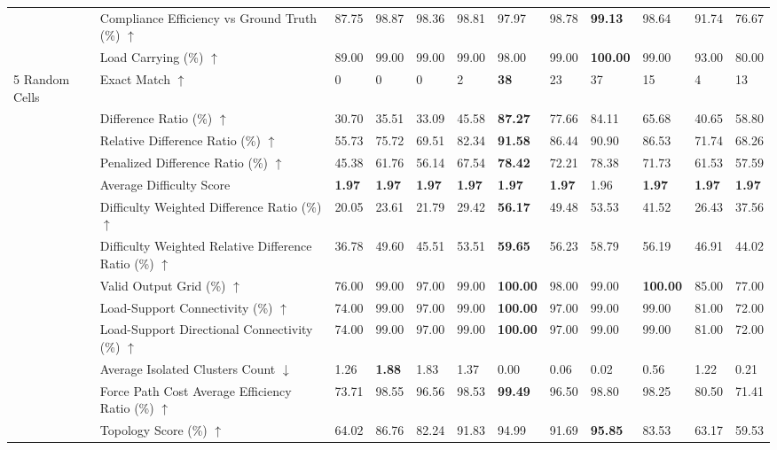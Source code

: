 \begin{table}[!h]
{\begin{tabular}{llllllllllll}
 & Compliance Efficiency vs Ground Truth (\%) $\uparrow$ & 87.75 & 98.87 & 98.36 & 98.81 & 97.97 & 98.78 & \textbf{99.13} & 98.64 & 91.74 & 76.67 \\
 & Load Carrying (\%) $\uparrow$ & 89.00 & 99.00 & 99.00 & 99.00 & 98.00 & 99.00 & \textbf{100.00} & 99.00 & 93.00 & 80.00 \\
5 Random Cells & Exact Match $\uparrow$ & 0 & 0 & 0 & 2 & \textbf{38} & 23 & 37 & 15 & 4 & 13 \\
 & Difference Ratio (\%) $\uparrow$ & 30.70 & 35.51 & 33.09 & 45.58 & \textbf{87.27} & 77.66 & 84.11 & 65.68 & 40.65 & 58.80 \\
 & Relative Difference Ratio (\%) $\uparrow$ & 55.73 & 75.72 & 69.51 & 82.34 & \textbf{91.58} & 86.44 & 90.90 & 86.53 & 71.74 & 68.26 \\
 & Penalized Difference Ratio (\%) $\uparrow$ & 45.38 & 61.76 & 56.14 & 67.54 & \textbf{78.42} & 72.21 & 78.38 & 71.73 & 61.53 & 57.59 \\
 & Average Difficulty Score & \textbf{1.97} & \textbf{1.97} & \textbf{1.97} & \textbf{1.97} & \textbf{1.97} & \textbf{1.97} & 1.96 & \textbf{1.97} & \textbf{1.97} & \textbf{1.97} \\
 & Difficulty Weighted Difference Ratio (\%) $\uparrow$ & 20.05 & 23.61 & 21.79 & 29.42 & \textbf{56.17} & 49.48 & 53.53 & 41.52 & 26.43 & 37.56 \\
 & Difficulty Weighted Relative Difference Ratio (\%) $\uparrow$ & 36.78 & 49.60 & 45.51 & 53.51 & \textbf{59.65} & 56.23 & 58.79 & 56.19 & 46.91 & 44.02 \\
 & Valid Output Grid (\%) $\uparrow$ & 76.00 & 99.00 & 97.00 & 99.00 & \textbf{100.00} & 98.00 & 99.00 & \textbf{100.00} & 85.00 & 77.00 \\
 & Load-Support Connectivity (\%) $\uparrow$ & 74.00 & 99.00 & 97.00 & 99.00 & \textbf{100.00} & 97.00 & 99.00 & 99.00 & 81.00 & 72.00 \\
 & Load-Support Directional Connectivity (\%) $\uparrow$ & 74.00 & 99.00 & 97.00 & 99.00 & \textbf{100.00} & 97.00 & 99.00 & 99.00 & 81.00 & 72.00 \\
 & Average Isolated Clusters Count $\downarrow$ & 1.26 & \textbf{1.88} & 1.83 & 1.37 & 0.00 & 0.06 & 0.02 & 0.56 & 1.22 & 0.21 \\
 & Force Path Cost Average Efficiency Ratio (\%) $\uparrow$ & 73.71 & 98.55 & 96.56 & 98.53 & \textbf{99.49} & 96.50 & 98.80 & 98.25 & 80.50 & 71.41 \\
 & Topology Score (\%) $\uparrow$ & 64.02 & 86.76 & 82.24 & 91.83 & 94.99 & 91.69 & \textbf{95.85} & 83.53 & 63.17 & 59.53 \\

\end{tabular}}
\end{table}
